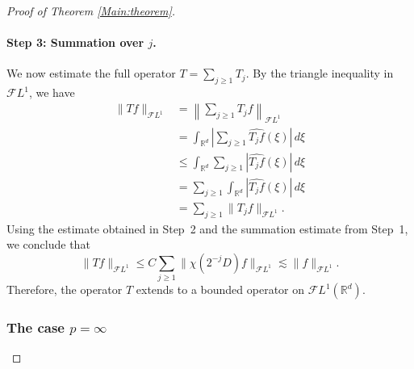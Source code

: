 \documentclass[12pt, reqno]{amsart}
\theoremstyle{definition}
\theoremstyle{remark}
\numberwithin{equation}{section}
\begin{document}
\begin{proof}[Proof of Theorem \ref{Main:theorem}]
\paragraph{Step 3: Summation over $j$.}
We now estimate the full operator $T=\sum_{j\ge1}T_j$.
By the triangle inequality in $\mathcal{F}L^1$, we have
\begin{align*}
\|Tf\|_{\mathcal{F}L^1}
&=
\left\|
\sum_{j\ge1} T_j f
\right\|_{\mathcal{F}L^1} \\
&=
\int_{\mathbb{R}^d}
\left|
\sum_{j\ge1} \widehat{T_j f}(\xi)
\right|
\,d\xi \\
&\le
\int_{\mathbb{R}^d}
\sum_{j\ge1}
\left|
\widehat{T_j f}(\xi)
\right|
\,d\xi \\
&=
\sum_{j\ge1}
\int_{\mathbb{R}^d}
\left|
\widehat{T_j f}(\xi)
\right|
\,d\xi \\
&=
\sum_{j\ge1}
\|T_j f\|_{\mathcal{F}L^1}.
\end{align*}
Using the estimate obtained in Step~2 and the summation estimate from Step~1,
we conclude that
\[
\|Tf\|_{\mathcal{F}L^1}
\le
C
\sum_{j\ge1}
\|\chi(2^{-j}D)f\|_{\mathcal{F}L^1}
\lesssim
\|f\|_{\mathcal{F}L^1}.
\]
Therefore, the operator $T$ extends to a bounded operator on
$\mathcal{F}L^1(\mathbb{R}^d)$.

\subsubsection*{The case $p=\infty$}


\end{proof}
\end{document}
